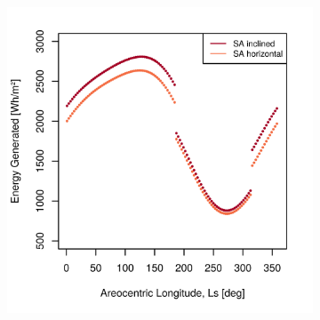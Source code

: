 \begin{figure}[h]
\captionsetup[subfigure]{justification=centering}
\vspace{-2ex}
	\centering
    \setlength{\subfigureWidth}{0.50\textwidth}
    \setlength{\graphicsHeight}{80mm}
    \hypersetup{hidelinks=true}%
    \begin{subfigure}[t]{\subfigureWidth}
        \centering
        \includegraphics[height=\graphicsHeight]{sections/design/solar-array/plots/ismeniuscavus-daily-generated-energy-for-sa-area-48m2.png}
        \label{fig:plot:sub:ismenius-cavus-generated-energy}
    \end{subfigure}\hfill
    \begin{subfigure}[t]{\subfigureWidth}
        \centering

\end{subfigure}
\end{figure}
